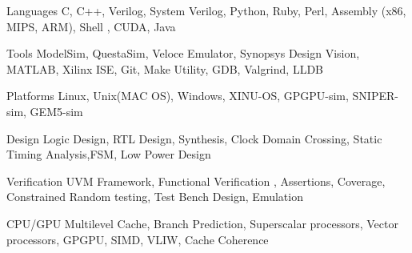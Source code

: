 

\begin{cvskills}

  \cvskill
    {Languages} %
    {C, C++, Verilog, System Verilog, Python, Ruby, Perl, Assembly (x86, MIPS, ARM), Shell , CUDA, Java} %

  \cvskill
    {Tools} %
    {ModelSim, QuestaSim, Veloce Emulator, Synopsys Design Vision, MATLAB, Xilinx ISE, Git, Make Utility, GDB, Valgrind, LLDB} %

    \cvskill
    {Platforms} %
    {Linux, Unix(MAC OS), Windows, XINU-OS, GPGPU-sim, SNIPER-sim, GEM5-sim} %

  \cvskill
    {Design} %
    { Logic Design, RTL Design, Synthesis, Clock Domain Crossing, Static Timing Analysis,FSM, Low Power Design} %

  \cvskill
    {Verification} %
    {UVM Framework, Functional Verification , Assertions, Coverage, Constrained Random testing, Test Bench Design, Emulation} %

  \cvskill
    {CPU/GPU} %
    {Multilevel Cache, Branch Prediction, Superscalar processors, Vector processors, GPGPU, SIMD, VLIW, Cache Coherence} %

  

\end{cvskills}
